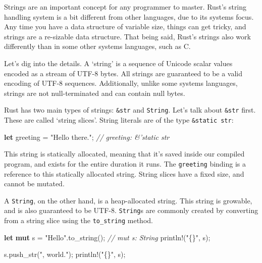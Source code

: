 \documentclass[a4paper,]{book}
\newenvironment{Shaded}{\begin{snugshade}}{\end{snugshade}}
\newcommand{\KeywordTok}[1]{\textcolor[rgb]{0.13,0.29,0.53}{\textbf{{#1}}}}
\newcommand{\StringTok}[1]{\textcolor[rgb]{0.31,0.60,0.02}{{#1}}}
\newcommand{\CommentTok}[1]{\textcolor[rgb]{0.56,0.35,0.01}{\textit{{#1}}}}
\newcommand{\OtherTok}[1]{\textcolor[rgb]{0.56,0.35,0.01}{{#1}}}
\newcommand{\NormalTok}[1]{{#1}}
\begin{document}
Strings are an important concept for any programmer to master. Rust's
string handling system is a bit different from other languages, due to
its systems focus. Any time you have a data structure of variable size,
things can get tricky, and strings are a re-sizable data structure. That
being said, Rust's strings also work differently than in some other
systems languages, such as C.

Let's dig into the details. A `string' is a sequence of Unicode scalar
values encoded as a stream of UTF-8 bytes. All strings are guaranteed to
be a valid encoding of UTF-8 sequences. Additionally, unlike some
systems languages, strings are not null-terminated and can contain null
bytes.

Rust has two main types of strings: \texttt{\&str} and \texttt{String}.
Let's talk about \texttt{\&str} first. These are called `string slices'.
String literals are of the type
\texttt{\&\textquotesingle{}static\ str}:

\begin{Shaded}
\begin{Highlighting}[]
\KeywordTok{let} \NormalTok{greeting = }\StringTok{"Hello there."}\NormalTok{; }\CommentTok{// greeting: &'static str}
\end{Highlighting}
\end{Shaded}

This string is statically allocated, meaning that it's saved inside our
compiled program, and exists for the entire duration it runs. The
\texttt{greeting} binding is a reference to this statically allocated
string. String slices have a fixed size, and cannot be mutated.

A \texttt{String}, on the other hand, is a heap-allocated string. This
string is growable, and is also guaranteed to be UTF-8. \texttt{String}s
are commonly created by converting from a string slice using the
\texttt{to\_string} method.

\begin{Shaded}
\begin{Highlighting}[]
\KeywordTok{let} \KeywordTok{mut} \NormalTok{s = }\StringTok{"Hello"}\NormalTok{.to_string(); }\CommentTok{// mut s: String}
\OtherTok{println!}\NormalTok{(}\StringTok{"\{\}"}\NormalTok{, s);}

\NormalTok{s.push_str(}\StringTok{", world."}\NormalTok{);}
\OtherTok{println!}\NormalTok{(}\StringTok{"\{\}"}\NormalTok{, s);}
\end{Highlighting}
\end{Shaded}
\end{document}
